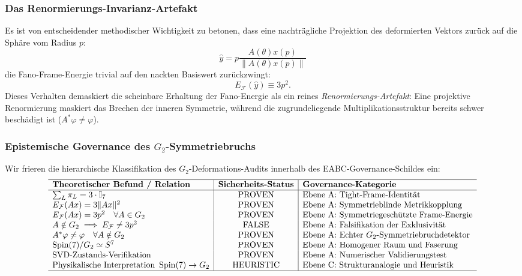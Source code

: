 \documentclass[11pt,a4paper]{article}
\theoremstyle{definition}
\begin{document}
	\subsubsection{Das Renormierungs-Invarianz-Artefakt}
	Es ist von entscheidender methodischer Wichtigkeit zu betonen, dass eine nachträgliche Projektion des deformierten Vektors zurück auf die Sphäre vom Radius $p$:
	\begin{equation}
		\widehat{y} = p \frac{A(\theta)x(p)}{\|A(\theta)x(p)\|}
	\end{equation}
	die Fano-Frame-Energie trivial auf den nackten Basiswert zurückzwingt:
	\begin{equation}
		E_{\mathcal{F}}(\widehat{y}) \equiv 3p^2.
	\end{equation}
	Dieses Verhalten demaskiert die scheinbare Erhaltung der Fano-Energie als ein reines \emph{Renormierungs-Artefakt}: Eine projektive Renormierung maskiert das Brechen der inneren Symmetrie, während die zugrundeliegende Multiplikationsstruktur bereits schwer beschädigt ist ($A^* \varphi \neq \varphi$).
	
	\subsubsection{Epistemische Governance des $G_2$-Symmetriebruchs}
	Wir frieren die hierarchische Klassifikation des $G_2$-Deformations-Audits innerhalb des EABC-Governance-Schildes ein:
	\begin{equation}
		\begin{array}{l|c|l}
			\hline
			\textbf{Theoretischer Befund / Relation} & \textbf{Sicherheits-Status} & \textbf{Governance-Kategorie} \\
			\hline
			\sum_L \pi_L = 3 \cdot \mathbb{I}_7 & \mathrm{PROVEN} & \text{Ebene A: Tight-Frame-Identität} \\
			E_{\mathcal{F}}(Ax) = 3\|Ax\|^2 & \mathrm{PROVEN} & \text{Ebene A: Symmetrieblinde Metrikkopplung} \\
			E_{\mathcal{F}}(Ax) = 3p^2 \quad \forall A \in G_2 & \mathrm{PROVEN} & \text{Ebene A: Symmetriegeschützte Frame-Energie} \\
			A \notin G_2 \implies E_{\mathcal{F}} \neq 3p^2 & \mathrm{FALSE} & \text{Ebene A: Falsifikation der Exklusivität} \\
			A^* \varphi \neq \varphi \quad \forall A \notin G_2 & \mathrm{PROVEN} & \text{Ebene A: Echter $G_2$-Symmetriebruchdetektor} \\
			\operatorname{Spin}(7)/G_2 \simeq S^7 & \mathrm{PROVEN} & \text{Ebene A: Homogener Raum und Faserung} \\
			\text{SVD-Zustands-Verifikation} & \mathrm{PROVEN} & \text{Ebene A: Numerischer Validierungstest} \\
			\text{Physikalische Interpretation } \operatorname{Spin}(7) \to G_2 & \mathrm{HEURISTIC} & \text{Ebene C: Strukturanalogie und Heuristik} \\
			\hline
		\end{array}
	\end{equation}
	
\end{document}
